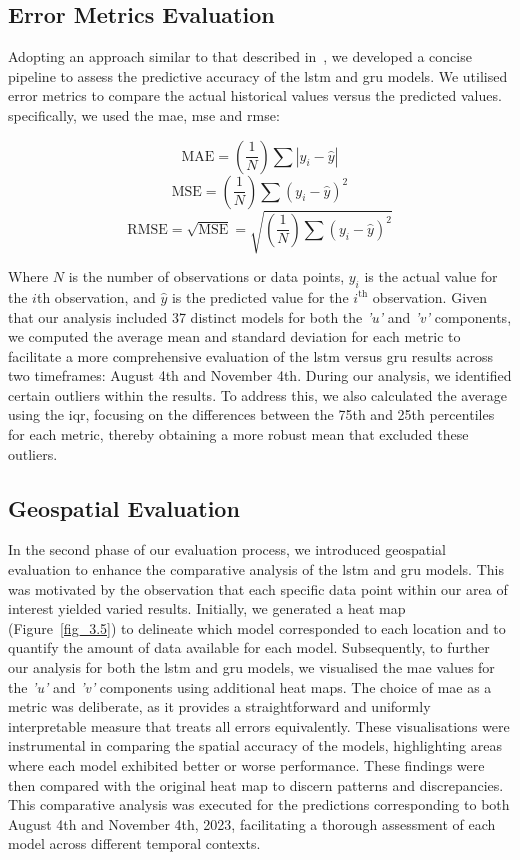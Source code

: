 \subsection{Error Metrics Evaluation}
\label{subsec:3.5.1}

Adopting an approach similar to that described in~\cite{49}, we developed a concise pipeline to assess the predictive accuracy of the \acrshort{lstm} and \acrshort{gru} models. We utilised error metrics to compare the actual historical values versus the predicted values. specifically, we used the \acrshort{mae}, \acrshort{mse} and \acrshort{rmse}:

\[
\text{MAE} = \left(\frac{1}{N}\right) \sum \left|y_i - \hat{y}\right|
\]
\[
\text{MSE} = \left(\frac{1}{N}\right) \sum \left(y_i - \hat{y}\right)^2
\]
\[
\text{RMSE} = \sqrt{\text{MSE}} = \sqrt{\left(\frac{1}{N}\right) \sum \left(y_i - \hat{y}\right)^2}
\]

Where $N$ is the number of observations or data points, $y_i$ is the actual value for the $i$th observation, and $\hat{y}$ is the predicted value for the $i^\text{th}$ observation. Given that our analysis included 37 distinct models for both the \textit{'u'} and \textit{'v'} components, we computed the average mean and standard deviation for each metric to facilitate a more comprehensive evaluation of the \acrshort{lstm} versus \acrshort{gru} results across two timeframes: August 4th and November 4th. During our analysis, we identified certain outliers within the results. To address this, we also calculated the average using the \acrshort{iqr}, focusing on the differences between the 75th and 25th percentiles for each metric, thereby obtaining a more robust mean that excluded these outliers.

\subsection{Geospatial Evaluation}
\label{subsec:3.5.2}

In the second phase of our evaluation process, we introduced geospatial evaluation to enhance the comparative analysis of the \acrshort{lstm} and \acrshort{gru} models. This was motivated by the observation that each specific data point within our area of interest yielded varied results. Initially, we generated a heat map (Figure~\ref{fig_3.5}) to delineate which model corresponded to each location and to quantify the amount of data available for each model. Subsequently, to further our analysis for both the \acrshort{lstm} and \acrshort{gru} models, we visualised the \acrshort{mae} values for the \textit{'u'} and \textit{'v'} components using additional heat maps. The choice of \acrshort{mae} as a metric was deliberate, as it provides a straightforward and uniformly interpretable measure that treats all errors equivalently. These visualisations were instrumental in comparing the spatial accuracy of the models, highlighting areas where each model exhibited better or worse performance. These findings were then compared with the original heat map to discern patterns and discrepancies. This comparative analysis was executed for the predictions corresponding to both August 4th and November 4th, 2023, facilitating a thorough assessment of each model across different temporal contexts.

